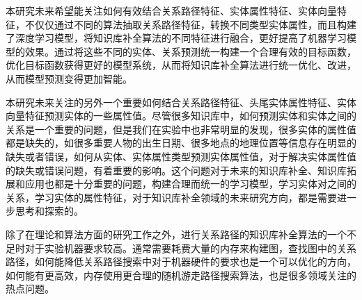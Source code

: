 本研究未来希望能关注如何有效结合关系路径特征、实体属性特征、实体向量特征，不仅仅通过不同的算法抽取关系路径特征，转换不同类型实体属性，而且构建了深度学习模型，将知识库补全算法的不同特征进行融合，更好提高了机器学习模型的效果。通过将这些不同的实体、关系预测统一构建一个合理有效的目标函数，优化目标函数获得更好的模型系统，从而将知识库补全算法进行统一优化、改进，从而模型预测变得更加智能。

本研究未来关注的另外一个重要如何结合关系路径特征、头尾实体属性特征、实体向量特征预测实体的一些属性值。尽管很多知识库中，如何预测实体和实体之间的关系是一个重要的问题，但是我们在实验中也非常明显的发现，很多实体的属性值都是缺失的，如很多重要人物的出生日期、很多地点的地理位置等信息存在明显的缺失或者错误，如何从实体、实体属性类型预测实体属性值，对于解决实体属性值的缺失或错误问题，有着重要的影响。这个问题对于未来的知识库补全、知识库拓展和应用也都是十分重要的问题，构建合理而统一的学习模型，学习实体对之间的关系，学习实体的属性特征，对于知识库补全领域的未来研究方向，都是需要进一步思考和探索的。

除了在理论和算法方面的研究工作之外，进行关系路径的知识库补全算法的一个不足时对于实验机器要求较高。通常需要耗费大量的内存来构建图，查找图中的关系路径，如何能降低关系路径搜索中对于机器硬件的要求也是一个可以优化的方向，如何能有更高效，内存使用更合理的随机游走路径搜索算法，也是很多领域关注的热点问题。